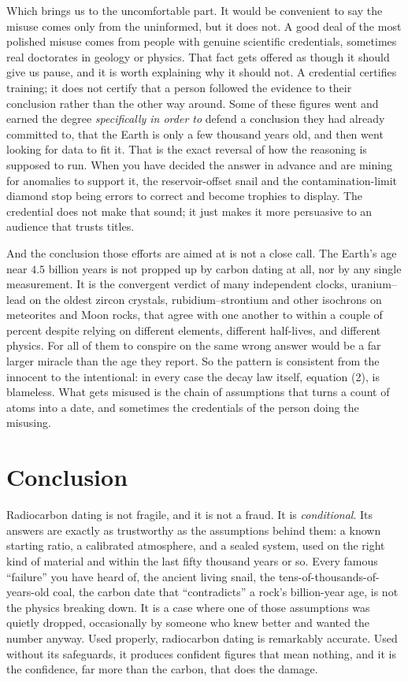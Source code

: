 \documentclass[11pt]{article}
\begin{document}
Which brings us to the uncomfortable part. It would be convenient to say the misuse comes only from the uninformed, but it does not. A good deal of the most polished misuse comes from people with genuine scientific credentials, sometimes real doctorates in geology or physics. That fact gets offered as though it should give us pause, and it is worth explaining why it should not. A credential certifies training; it does not certify that a person followed the evidence to their conclusion rather than the other way around. Some of these figures went and earned the degree \emph{specifically in order to} defend a conclusion they had already committed to, that the Earth is only a few thousand years old, and then went looking for data to fit it. That is the exact reversal of how the reasoning is supposed to run. When you have decided the answer in advance and are mining for anomalies to support it, the reservoir-offset snail and the contamination-limit diamond stop being errors to correct and become trophies to display. The credential does not make that sound; it just makes it more persuasive to an audience that trusts titles.

And the conclusion those efforts are aimed at is not a close call. The Earth's age near $4.5$ billion years is not propped up by carbon dating at all, nor by any single measurement. It is the convergent verdict of many independent clocks, uranium--lead on the oldest zircon crystals, rubidium--strontium and other isochrons on meteorites and Moon rocks, that agree with one another to within a couple of percent despite relying on different elements, different half-lives, and different physics. For all of them to conspire on the same wrong answer would be a far larger miracle than the age they report. So the pattern is consistent from the innocent to the intentional: in every case the decay law itself, equation (2), is blameless. What gets misused is the chain of assumptions that turns a count of atoms into a date, and sometimes the credentials of the person doing the misusing.

\section*{Conclusion}

Radiocarbon dating is not fragile, and it is not a fraud. It is \emph{conditional}. Its answers are exactly as trustworthy as the assumptions behind them: a known starting ratio, a calibrated atmosphere, and a sealed system, used on the right kind of material and within the last fifty thousand years or so. Every famous ``failure'' you have heard of, the ancient living snail, the tens-of-thousands-of-years-old coal, the carbon date that ``contradicts'' a rock's billion-year age, is not the physics breaking down. It is a case where one of those assumptions was quietly dropped, occasionally by someone who knew better and wanted the number anyway. Used properly, radiocarbon dating is remarkably accurate. Used without its safeguards, it produces confident figures that mean nothing, and it is the confidence, far more than the carbon, that does the damage.
\end{document}
